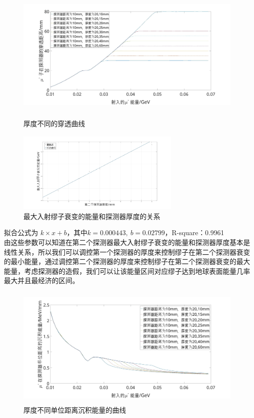 \documentclass[UTF8]{ctexart}
\begin{document}
\begin{figure}[h]
\centering
    \includegraphics[width=120mm,height=60mm]{pic/dis.jpg}
    \caption{厚度不同的穿透曲线}\label{fig:di}
    \includegraphics[width=80mm,height=40mm]{pic/quxian.jpg}
    \caption{最大入射缪子衰变的能量和探测器厚度的关系}\label{fig:di_linear}
\end{figure}


拟合公式为 $k\times x + b$，其中$k = 0.000443,\ b= 0.02799$，R-square：0.9961\\


由这些参数可以知道在第二个探测器最大入射缪子衰变的能量和探测器厚度基本是线性关系，所以我们可以调控第一个探测器的厚度来控制缪子在第二个探测器衰变的最小能量，通过调控第二个探测器的厚度来控制缪子在第二个探测器衰变的最大能量，考虑探测器的造假，我们可以让该能量区间对应缪子达到地球表面能量几率最大并且最经济的区间。\\

\begin{figure}[H]
\centering
    \includegraphics[width=120mm,height=60mm]{pic/en_dis.jpg}
    \caption{厚度不同单位距离沉积能量的曲线}
\end{figure}
\end{document}
